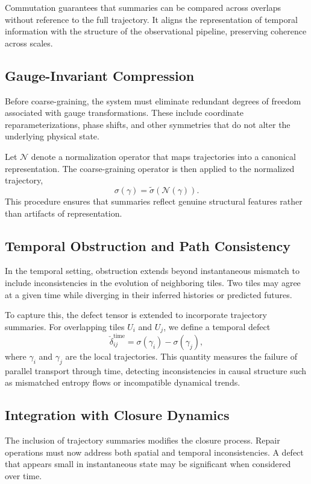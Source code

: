 \documentclass[12pt, oneside]{article}
\begin{document}
Commutation guarantees that summaries can be compared across overlaps without reference to the full trajectory. It aligns the representation of temporal information with the structure of the observational pipeline, preserving coherence across scales.

\subsection{Gauge-Invariant Compression}

Before coarse-graining, the system must eliminate redundant degrees of freedom associated with gauge transformations. These include coordinate reparameterizations, phase shifts, and other symmetries that do not alter the underlying physical state.

Let $\mathcal{N}$ denote a normalization operator that maps trajectories into a canonical representation. The coarse-graining operator is then applied to the normalized trajectory,
\[
\sigma(\gamma) = \tilde{\sigma}(\mathcal{N}(\gamma)).
\]
This procedure ensures that summaries reflect genuine structural features rather than artifacts of representation.

\subsection{Temporal Obstruction and Path Consistency}

In the temporal setting, obstruction extends beyond instantaneous mismatch to include inconsistencies in the evolution of neighboring tiles. Two tiles may agree at a given time while diverging in their inferred histories or predicted futures.

To capture this, the defect tensor is extended to incorporate trajectory summaries. For overlapping tiles $U_i$ and $U_j$, we define a temporal defect
\[
\check{\delta}_{ij}^{\text{time}} = \sigma(\gamma_i) - \sigma(\gamma_j),
\]
where $\gamma_i$ and $\gamma_j$ are the local trajectories. This quantity measures the failure of parallel transport through time, detecting inconsistencies in causal structure such as mismatched entropy flows or incompatible dynamical trends.

\subsection{Integration with Closure Dynamics}

The inclusion of trajectory summaries modifies the closure process. Repair operations must now address both spatial and temporal inconsistencies. A defect that appears small in instantaneous state may be significant when considered over time.
\end{document}
